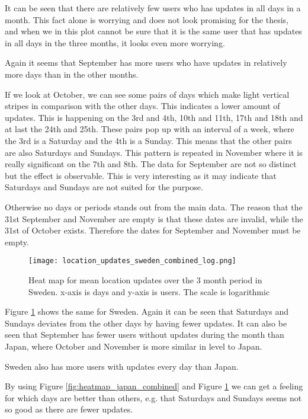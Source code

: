 It can be seen that there are relatively few users who has updates in all days in a month. This fact alone is worrying and does not look promising for the thesis, and when we in this plot cannot be sure that it is the same user that has updates in all days in the three months, it looks even more worrying. 

Again it seems that September has more users who have updates in relatively more days than in the other months. 

If we look at October, we can see some pairs of days which make light vertical stripes in comparison with the other days. This indicates a lower amount of updates. This is happening  on the 3rd and 4th, 10th and 11th, 17th and 18th and at last the 24th and 25th. These pairs pop up with an interval of a week, where the 3rd is a Saturday and the 4th is a Sunday. This means that the other pairs are also Saturdays and Sundays. This pattern is repeated in November where it is really significant on the 7th and 8th. The data for September are not so distinct but the effect is observable. This is very interesting as it may indicate that Saturdays and Sundays are not suited for the purpose. 

Otherwise no days or periods stands out from the main data. The reason that the 31st September and November are empty is that these dates are invalid, while the 31st of October exists. Therefore the dates for September and November must be empty.  

\begin{figure}[H]
    \hspace*{-1.5cm}
    \centering
    \texttt{[image: location\_updates\_sweden\_combined\_log.png]}
    \caption{Heat map for mean location updates over the 3 month period in Sweden. x-axis is days and y-axis is users. The scale is logarithmic}
    \label{fig:heatmap_sweden_combined}
\end{figure}
Figure \ref{fig:heatmap_sweden_combined} shows the same for Sweden. Again it can be seen that Saturdays and Sundays deviates from the other days by having fewer updates. It can also be seen that September has fewer users without updates during the month than Japan, where October and November is more similar in level to Japan. 

Sweden also has more users with updates every day than Japan. 

By using Figure \ref{fig:heatmap_japan_combined} and Figure \ref{fig:heatmap_sweden_combined} we can get a feeling for which days are better than others, e.g. that Saturdays and Sundays seems not so good as there are fewer updates. 

